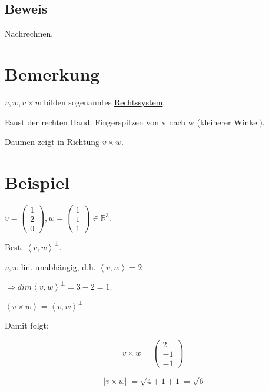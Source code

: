 \documentclass[a4paper, openany]{book}
\begin{document}
        \subsection{Beweis}

        Nachrechnen. 

        \section{Bemerkung}

        $v, w, v \times w$ bilden sogenanntes \underline{Rechtssystem}.

        Faust der rechten Hand. Fingerspitzen von v nach w (kleinerer Winkel).

        Daumen zeigt in Richtung $v \times w$.

        \section{Beispiel}

        $v = \begin{pmatrix}1 \\ 2 \\ 0 \end{pmatrix}, w = \begin{pmatrix}1 \\ 1 \\ 1 \end{pmatrix} \in \mathbb{R}^3$.

        \par \medskip

        Best. $\left \langle v, w \right \rangle^{\perp}$.

        $v, w$ lin. unabhängig, d.h. $\left \langle v,w \right \rangle = 2$

        $\Rightarrow dim \left \langle v,w \right \rangle^{\perp} = 3-2 = 1$.

        \par \medskip

        $\left \langle v \times w \right \rangle = \left \langle v,w \right \rangle^{\perp}$

        Damit folgt:

        \[ v \times w = \begin{pmatrix}2 \\ -1 \\ -1 \end{pmatrix} \]

        \[ || v \times w || = \sqrt{4 + 1+1} = \sqrt{6} \]
\end{document}
